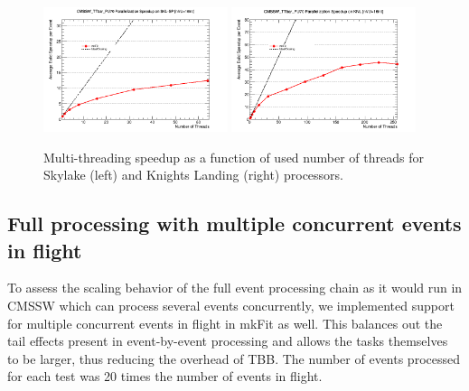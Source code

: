 \documentclass{webofc}
\def\mkfit{mkFit\xspace}
\def\twop{0.48\textwidth}
\def\postfigskip{\vskip-4mm}
\begin{document}
\begin{figure}[htb]
  \centering
  \includegraphics[width=\twop]{figs/comp/SKL-SP_CMSSW_TTbar_PU70_TH_speedup.png}
  \hfill
  \includegraphics[width=\twop]{figs/comp/KNL_CMSSW_TTbar_PU70_TH_speedup.png}
  \postfigskip

  \caption{Multi-threading speedup as a function of used number of threads for
    Skylake (left) and Knights Landing (right) processors.}
  \label{fig:th-speedup}
\end{figure}


\subsection{Full processing with multiple concurrent events in flight}

To assess the scaling behavior of the full event processing chain as it would
run in CMSSW which can process several events concurrently, we implemented
support for multiple concurrent events in flight in \mkfit as well. This
balances out the tail effects present in event-by-event processing and allows
the tasks themselves to be larger, thus reducing the overhead of TBB. The 
number of events processed for each test was 20 times the number of events in 
flight. 
\end{document}

